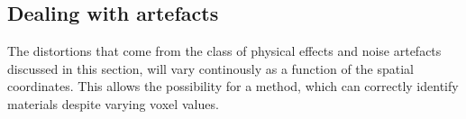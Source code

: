\subsection{Dealing with artefacts}
\label{sec:dealwithit}

The distortions that come from the class of physical effects and noise artefacts discussed in this
section, will vary continously as a function of the spatial coordinates. This allows the possibility
for a method, which can correctly identify materials despite varying voxel values.



